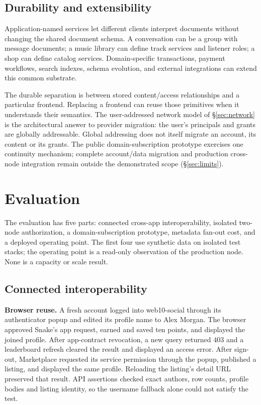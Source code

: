 \documentclass[sigconf, nonacm]{acmart}
\begin{document}
\subsection{Durability and extensibility}

Application-named services let different clients interpret documents without
changing the shared document schema. A conversation can be a group with message
documents; a music library can define track services and listener roles; a
shop can define catalog services. Domain-specific transactions, payment
workflows, search indexes, schema evolution, and external integrations can
extend this common substrate.

The durable separation is between stored content/access relationships and a
particular frontend. Replacing a frontend can reuse those primitives when it
understands their semantics. The user-addressed network model of
\S\ref{sec:network} is the architectural answer to provider migration: the
user's principals and grants are globally addressable. Global addressing does
not itself migrate an account, its content or its grants. The public
domain-subscription prototype exercises one continuity mechanism; complete
account/data migration and production cross-node integration remain outside
the demonstrated scope (\S\ref{sec:limits}).

\section{Evaluation}
\label{sec:method}

The evaluation has five parts: connected cross-app interoperability,
isolated two-node authorization, a domain-subscription prototype, metadata
fan-out cost, and a deployed operating point. The first four use synthetic
data on isolated test stacks; the
operating point is a read-only observation of the production node. None is a
capacity or scale result.

\subsection{Connected interoperability}
\label{sec:interop-results}

\textbf{Browser reuse.} A fresh account logged into web10-social through its
authenticator popup and edited its profile name to Alex Morgan. The browser
approved Snake's app request, earned and saved ten points, and displayed the
joined profile. After app-contract revocation, a new query returned 403 and a
leaderboard refresh cleared the result and displayed an access error. After
sign-out, Marketplace requested its service permission through the popup,
published a listing, and displayed the same profile. Reloading the listing's
detail URL preserved that result. API assertions checked exact authors, row
counts, profile bodies and listing identity, so the username fallback alone
could not satisfy the test.
\end{document}
